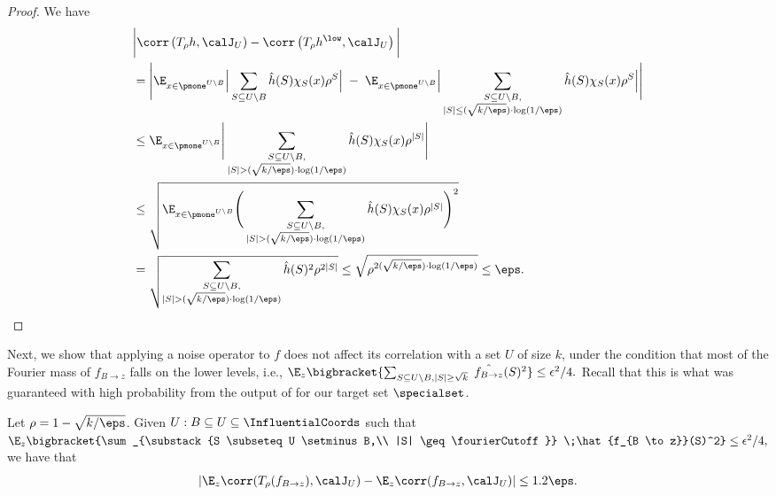 \begin{proof}
We have
\begin{align*}
& \bigg|\corr\left(T_\rho h, \calJ_U\right) - \corr\left(T_\rho h^{\low}, \calJ_U\right)\bigg|\\
   &= \Bigg|\E_{\substack{x \in \pmone^{U \setminus B}}}
     \Big | \sum_{S \subseteq U\setminus B} \hat{h}(S)\chi_S(x)\rho^{S}\Big|
     \;-\;\E_{\substack{x \in \pmone^{U \setminus B}}}
     \Big |\sum_{\substack{S \subseteq U\setminus B,\\|S|\le (\sqrt{k/\eps}) \cdot \log(1/\eps)}} \hat{h}(S)\chi_S(x) \rho^{S}\Big|\Bigg|     \\
      &\le 
\E_{\substack{x \in \pmone^{U \setminus B}}}
     \Bigg |\sum_{\substack{S \subseteq U\setminus B,\\ |S|> (\sqrt{k/\eps}) \cdot \log(1/\eps)}} \hat{h}(S)\chi_S(x)\rho^{|S|} \Bigg|
     \\
     &\le \sqrt{\E_{\substack{x \in \pmone^{U \setminus B}}}
    \Bigg(\sum_{\substack{S \subseteq U\setminus B,\\|S|>(\sqrt{k/\eps}) \cdot \log(1/\eps)}} \hat{h}(S)\chi_S(x) \rho^{|S|}\Bigg)^2} \\
    &= \sqrt{\sum_{\substack{S\subseteq U\setminus B, \\ |S| > (\sqrt{k/\eps}) \cdot \log(1/\eps)}}\hat{h}(S)^2\rho^{2|S|}} 
    \le \sqrt{\rho^{2(\sqrt{k/\eps}) \cdot \log(1/\eps)}} 
    \le \eps.\qedhere
 \end{align*}
\end{proof}


Next, we show that applying a noise operator to $f$ does not affect its correlation with a set $U$ of size $k$, under the condition that most of the Fourier mass of $f_{B\to z}$ falls on the lower levels, i.e., $\E_z\bigbracket{\sum_{\substack{S \subseteq U \setminus B,  |S| \geq \sqrt{k}}} \;\hat{f_{B \to z}}(S)^2} \leq \epsilon^2/4.$ Recall that this is what was guaranteed with high probability from the output of  for our target set $\specialset$. 
\begin{claim}\label{claim:cor to cor noise}
Let $\rho = 1-\sqrt{k/\eps}$. 
 Given $U: B \subseteq U \subseteq \InfluentialCoords$ such that
 $\E_z\bigbracket{\sum_{\substack{S \subseteq U \setminus B,\\  |S| \geq \fourierCutoff}} \;\hat{f_{B \to z}}(S)^2} \leq \epsilon^2/4,$
we have that 
$$
\left |\E_z \corr(T_\rho (f_{B \to z}), \calJ_U) - \E_z \corr(f_{B \to z}, \calJ_U)\right| \leq 1.2 \eps.
$$
\end{claim}
 
